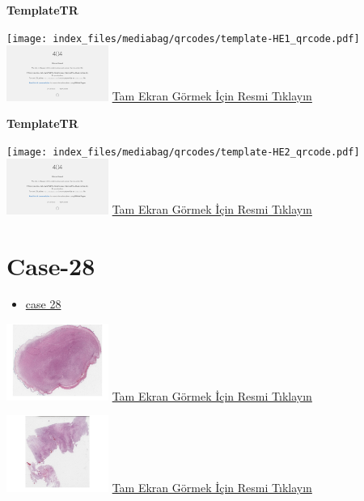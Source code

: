 \documentclass[
  letterpaper,
  DIV=11,
  numbers=noendperiod]{scrreprt}
\providecommand{\tightlist}{%
  \setlength{\itemsep}{0pt}\setlength{\parskip}{0pt}}\usepackage{longtable,booktabs,array}
\begin{document}
\textbf{TemplateTR}

\texttt{[image: index\_files/mediabag/qrcodes/template-HE1\_qrcode.pdf]}
\href{https://images.patolojiatlasi.com/template/HE1.html}{\includegraphics[width=0.25\textwidth,height=\textheight]{./screenshots/thumbnail_template-HE1.png}}
\href{https://images.patolojiatlasi.com/template/HE1.html}{Tam Ekran
Görmek İçin Resmi Tıklayın}

\textbf{TemplateTR}

\texttt{[image: index\_files/mediabag/qrcodes/template-HE2\_qrcode.pdf]}
\href{https://images.patolojiatlasi.com/template/HE2.html}{\includegraphics[width=0.25\textwidth,height=\textheight]{./screenshots/thumbnail_template-HE2.png}}
\href{https://images.patolojiatlasi.com/template/HE2.html}{Tam Ekran
Görmek İçin Resmi Tıklayın}

\hypertarget{sec-hacettepe-case-of-the-month-case-28}{%
\section{Case-28}\label{sec-hacettepe-case-of-the-month-case-28}}

\begin{itemize}
\tightlist
\item
  \href{https://www.youtube.com/watch?v=yUrabUzw3RI&ab_channel=KemalKosemehmetoglu}{case
  28}
\end{itemize}

\href{https://images.patolojiatlasi.com/hacettepe-com-case-28/HE1.html}{\includegraphics[width=0.25\textwidth,height=\textheight]{./screenshots/thumbnail_hacettepe-com-case-28-1.png}}
\href{https://images.patolojiatlasi.com/hacettepe-com-case-28/HE1.html}{Tam
Ekran Görmek İçin Resmi Tıklayın}

\href{https://images.patolojiatlasi.com/hacettepe-com-case-28/HE2.html}{\includegraphics[width=0.25\textwidth,height=\textheight]{./screenshots/thumbnail_hacettepe-com-case-28-2.png}}
\href{https://images.patolojiatlasi.com/hacettepe-com-case-28/HE2.html}{Tam
Ekran Görmek İçin Resmi Tıklayın}
\end{document}
